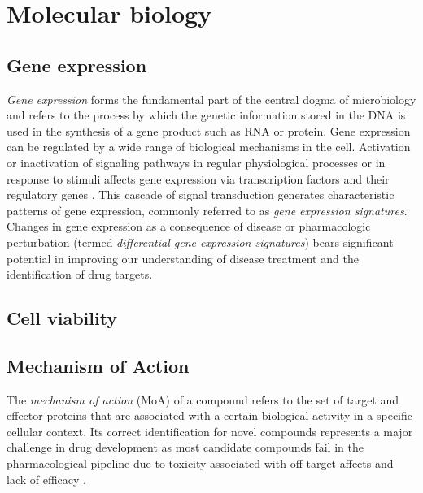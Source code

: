 \documentclass[bsc,frontabs,twoside,singlespacing,parskip,deptreport]{infthesis}     %
\let\Oldsection\section
\renewcommand{\section}{\FloatBarrier\Oldsection}
\let\Oldsubsection\subsection
\renewcommand{\subsection}{\FloatBarrier\Oldsubsection}
\begin{document}
\section{Molecular biology}
\subsection{Gene expression}
\textit{Gene expression} forms the fundamental part of the central dogma of microbiology \cite{crick_protein_1958} and refers to the process by which the genetic information stored in the DNA is used in the synthesis of a gene product such as RNA or protein. Gene expression can be regulated by a wide range of biological mechanisms in the cell. Activation or inactivation of signaling pathways in regular physiological processes or in response to stimuli affects gene expression via transcription factors and their regulatory genes \cite{itadani_can_2008}. This cascade of signal transduction generates characteristic patterns of gene expression, commonly referred to as \textit{gene expression signatures}.
Changes in gene expression as a consequence of disease or pharmacologic perturbation (termed \textit{differential gene expression signatures}) bears significant potential in improving our understanding of disease treatment and the identification of drug targets.
\subsection{Cell viability}
\subsection{Mechanism of Action}
The \textit{mechanism of action} (MoA) of a compound refers to the set of target and effector proteins that are associated with a certain biological activity in a specific cellular context. Its correct identification for novel compounds represents a major challenge in drug development as most candidate compounds fail in the pharmacological pipeline due to toxicity associated with off-target affects and lack of efficacy \cite{wehling_assessing_2009}.
\end{document}

